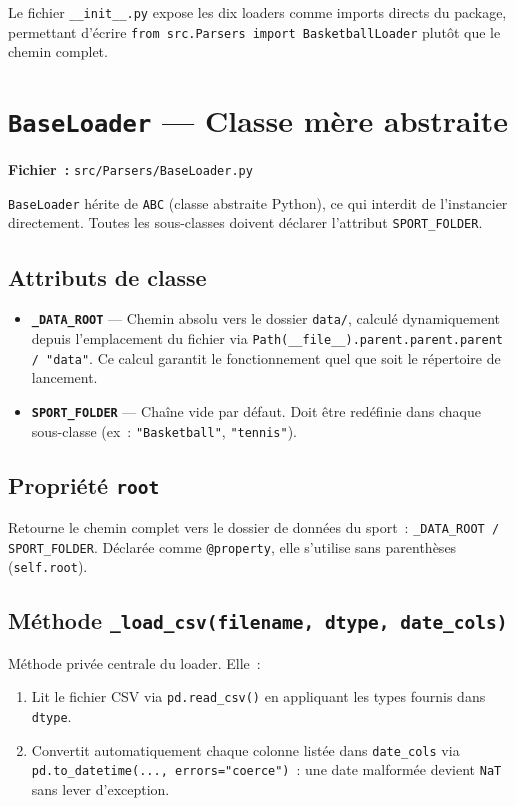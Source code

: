 \documentclass[12pt,a4paper]{article}
\newcommand{\fonction}[1]{\textbf{\texttt{#1}}}
\begin{document}
Le fichier \texttt{\_\_init\_\_.py} expose les dix loaders comme imports directs
du package, permettant d'écrire \texttt{from src.Parsers import BasketballLoader}
plutôt que le chemin complet.

\section{\texttt{BaseLoader} — Classe mère abstraite}

\textbf{Fichier~:} \texttt{src/Parsers/BaseLoader.py}

\texttt{BaseLoader} hérite de \texttt{ABC} (classe abstraite Python), ce qui
interdit de l'instancier directement. Toutes les sous-classes doivent déclarer
l'attribut \texttt{SPORT\_FOLDER}.

\subsection{Attributs de classe}

\begin{itemize}[leftmargin=1.5cm]
    \item \fonction{\_DATA\_ROOT} — Chemin absolu vers le dossier \texttt{data/},
    calculé dynamiquement depuis l'emplacement du fichier via
    \texttt{Path(\_\_file\_\_).parent.parent.parent / "data"}.
    Ce calcul garantit le fonctionnement quel que soit le répertoire de lancement.
    \item \fonction{SPORT\_FOLDER} — Chaîne vide par défaut.
    Doit être redéfinie dans chaque sous-classe (ex~: \texttt{"Basketball"},
    \texttt{"tennis"}).
\end{itemize}

\subsection{Propriété \texttt{root}}

Retourne le chemin complet vers le dossier de données du sport~:
\texttt{\_DATA\_ROOT / SPORT\_FOLDER}. Déclarée comme \texttt{@property},
elle s'utilise sans parenthèses (\texttt{self.root}).

\subsection{Méthode \texttt{\_load\_csv(filename, dtype, date\_cols)}}

Méthode privée centrale du loader. Elle~:
\begin{enumerate}
    \item Lit le fichier CSV via \texttt{pd.read\_csv()} en appliquant les types
    fournis dans \texttt{dtype}.
    \item Convertit automatiquement chaque colonne listée dans \texttt{date\_cols}
    via \texttt{pd.to\_datetime(..., errors="coerce")}~: une date malformée
    devient \texttt{NaT} sans lever d'exception.
\end{enumerate}
\end{document}
